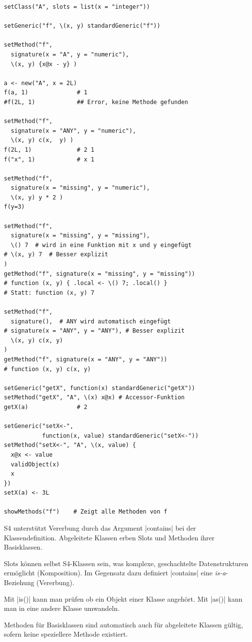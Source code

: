 \documentclass[10pt,twocolumn]{scrartcl}
\renewcommand{\lstinline}{\mycoloredinline}
\begin{document}
\begin{lstlisting}
setClass("A", slots = list(x = "integer"))

setGeneric("f", \(x, y) standardGeneric("f"))

setMethod("f",
  signature(x = "A", y = "numeric"),
  \(x, y) {x@x - y} )

a <- new("A", x = 2L)
f(a, 1)              # 1
#f(2L, 1)            ## Error, keine Methode gefunden

setMethod("f",
  signature(x = "ANY", y = "numeric"),
  \(x, y) c(x,  y) )
f(2L, 1)             # 2 1
f("x", 1)            # x 1

setMethod("f",
  signature(x = "missing", y = "numeric"),
  \(x, y) y * 2 )
f(y=3)

setMethod("f",
  signature(x = "missing", y = "missing"),
  \() 7  # wird in eine Funktion mit x und y eingefügt
# \(x, y) 7  # Besser explizit
)
getMethod("f", signature(x = "missing", y = "missing"))
# function (x, y) { .local <- \() 7; .local() }
# Statt: function (x, y) 7

setMethod("f",
  signature(),  # ANY wird automatisch eingefügt
# signature(x = "ANY", y = "ANY"), # Besser explizit
  \(x, y) c(x, y)
)
getMethod("f", signature(x = "ANY", y = "ANY"))
# function (x, y) c(x, y)

setGeneric("getX", function(x) standardGeneric("getX"))
setMethod("getX", "A", \(x) x@x) # Accessor-Funktion
getX(a)              # 2

setGeneric("setX<-",
           function(x, value) standardGeneric("setX<-"))
setMethod("setX<-", "A", \(x, value) {
  x@x <- value
  validObject(x)
  x
})
setX(a) <- 3L

showMethods("f")    # Zeigt alle Methoden von f
\end{lstlisting}

S4 unterstützt Vererbung durch das Argument \lstinline|contains| bei der Klassendefinition. Abgeleitete Klassen erben Slots und Methoden ihrer Basisklassen.

Slots können selbst S4-Klassen sein, was komplexe, geschachtelte Datenstrukturen ermöglicht (Komposition). Im Gegensatz dazu definiert \lstinline|contains| eine \textit{is-a}-Beziehung (Vererbung).

Mit \lstinline|is()| kann man prüfen ob ein Objekt einer Klasse angehört. Mit \lstinline|as()| kann man in eine andere Klasse umwandeln.

Methoden für Basisklassen sind automatisch auch für abgeleitete Klassen gültig, sofern keine speziellere Methode existiert.
\end{document}
